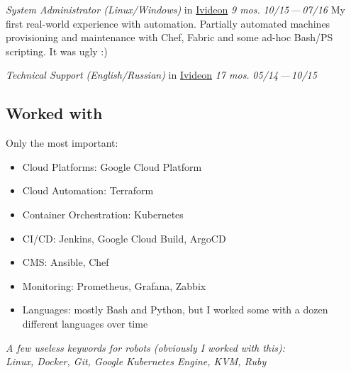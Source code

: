 \documentclass[11pt, a4paper]{article}
\newcommand{\Delimitline}{
  \vspace{-2ex}
  \noindent\makebox[\linewidth]{\rule{\DelimitlineLength}{0.12ex}} }
\newcommand{\forceindent}{\leavevmode{\parindent=1em\indent}}
\begin{document}
\begin{etaremune}[
  topsep=1ex,itemsep=1.5ex,partopsep=0ex,
  parsep=0ex,rightmargin=1em,leftmargin=2em
]
  \item
    \emph{System Administrator (Linux/Windows)}\hfill
    in \href{https://ivideon.com}{Ivideon}\hspace{1.0em}
    \textit{9 mos.}\hspace{1.0em}
    \textit{10/15\,—\,07/16}\vspace{1.5ex}\newline
    \forceindent My first real-world experience with automation. Partially automated machines provisioning and maintenance with Chef, Fabric and some ad-hoc Bash/PS scripting. It was ugly :)

  \item
    \emph{Technical Support (English/Russian)}\hfill
    in \href{https://ivideon.com}{Ivideon}\hspace{1.0em}
    \textit{17 mos.}\hspace{1.0em}
    \textit{05/14\,—\,10/15}
\end{etaremune}

\vspace{0ex}


\subsection*{Worked with\vphantom{ (skills)}}
\Delimitline

Only the most important:
\begin{itemize}
  \item Cloud Platforms: Google Cloud Platform
  \item Cloud Automation: Terraform
  \item Container Orchestration: Kubernetes
  \item CI/CD: Jenkins, Google Cloud Build, ArgoCD
  \item CMS: Ansible, Chef
  \item Monitoring: Prometheus, Grafana, Zabbix
  \item Languages: mostly Bash and Python, but I worked some with a dozen different languages over time
\end{itemize}\vspace{2ex}

\begin{flushright}
  \textit{A few useless keywords for robots (obviously I worked with this):\\
  Linux, Docker, Git, Google Kubernetes Engine, KVM, Ruby}
\end{flushright}


\subsection*{\vphantom{Education: }}
\vphantom{ middle school}
\end{document}
